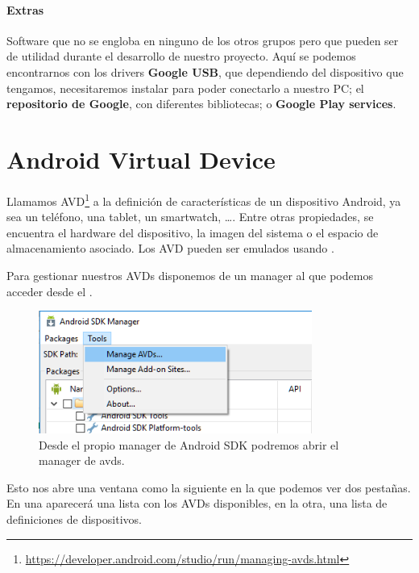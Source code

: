 \paragraph{Extras} Software que no se engloba en ninguno de los otros grupos pero que pueden ser de utilidad durante el desarrollo de nuestro proyecto. Aquí se podemos encontrarnos con los drivers \textbf{Google USB}, que dependiendo del dispositivo que tengamos, necesitaremos instalar para poder conectarlo a nuestro \gls{PC}; el \textbf{repositorio de Google}, con diferentes bibliotecas; o \textbf{Google Play services}.

\section{Android Virtual Device}\label{sec:AVD}

Llamamos \acrfull{AVD}\footnote{\url{https://developer.android.com/studio/run/managing-avds.html}} a la definición de características de un dispositivo Android, ya sea un teléfono, una tablet, un smartwatch, \ldots. Entre otras propiedades, se encuentra el hardware del dispositivo, la imagen del sistema o el espacio de almacenamiento asociado. Los \gls{AVD} pueden ser emulados usando .

Para gestionar nuestros \glspl{AVD} disponemos de un manager al que podemos acceder desde el .

\begin{figure}[H]
\centering
  \includegraphics[width=0.8\textwidth]{Figures/anexo/android_tools/avd_open_manager}
  \caption{Desde el propio manager de Android SDK podremos abrir el manager de avds.}
\end{figure}

Esto nos abre una ventana como la siguiente en la que podemos ver dos pestañas. En una aparecerá una lista con los \glspl{AVD} disponibles, en la otra, una lista de definiciones de dispositivos.

